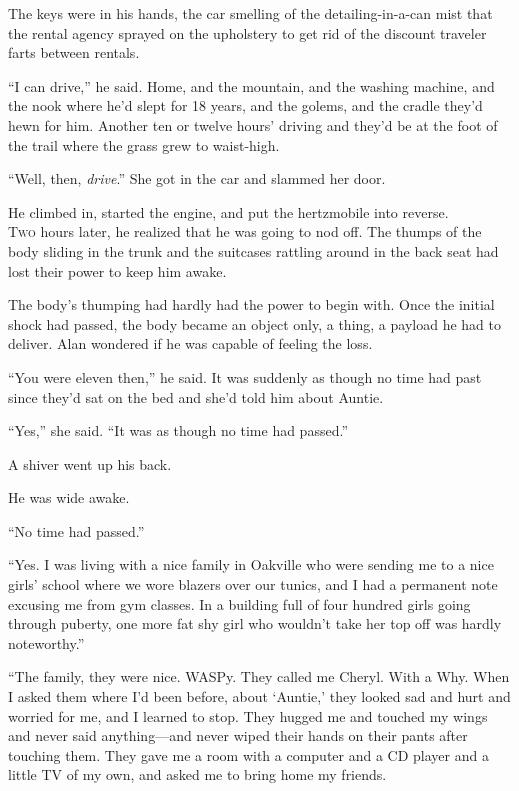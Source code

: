 \documentclass{article}
\begin{document}
The keys were in his hands, the car smelling of the detailing-in-a-can
mist that the rental agency sprayed on the upholstery to get rid of
the discount traveler farts between rentals.

``I can drive,'' he said.  Home, and the mountain, and the washing
machine, and the nook where he'd slept for 18 years, and the golems,
and the cradle they'd hewn for him.  Another ten or twelve hours'
driving and they'd be at the foot of the trail where the grass grew to
waist-high.

``Well, then, \textit{drive}.'' She got in the car and slammed her
door.

He climbed in, started the engine, and put the hertzmobile into
reverse.
\\
\lettrine[lines=3, lhang=.5, nindent=0pt, findent=2pt]{T}{wo} hours later, he realized that he was going to nod off.  The thumps
of the body sliding in the trunk and the suitcases rattling around in
the back seat had lost their power to keep him awake.

The body's thumping had hardly had the power to begin with.  Once the
initial shock had passed, the body became an object only, a thing, a
payload he had to deliver.  Alan wondered if he was capable of feeling
the loss.

``You were eleven then,'' he said.  It was suddenly as though no time
had past since they'd sat on the bed and she'd told him about Auntie.

``Yes,'' she said.  ``It was as though no time had passed.''

A shiver went up his back.

He was wide awake.

``No time had passed.''

``Yes.  I was living with a nice family in Oakville who were sending
me to a nice girls' school where we wore blazers over our tunics, and
I had a permanent note excusing me from gym classes.  In a building
full of four hundred girls going through puberty, one more fat shy
girl who wouldn't take her top off was hardly noteworthy.''

``The family, they were nice.  WASPy.  They called me Cheryl.  With a
Why.  When I asked them where I'd been before, about `Auntie,' they
looked sad and hurt and worried for me, and I learned to stop.  They
hugged me and touched my wings and never said anything---and never
wiped their hands on their pants after touching them.  They gave me a
room with a computer and a CD player and a little TV of my own, and
asked me to bring home my friends.
\end{document}
